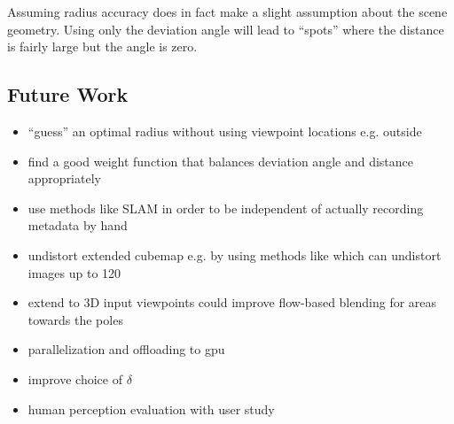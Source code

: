 Assuming radius accuracy does in fact make a slight assumption about the scene geometry. Using only the deviation angle will lead to ``spots'' where the distance is fairly large but the angle is zero. 

\subsection{Future Work}
\begin{itemize}
  \item ``guess'' an optimal radius without using viewpoint locations e.g. outside
  \item find a good weight function that balances deviation angle and distance appropriately
  \item use methods like SLAM in order to be independent of actually recording metadata by hand
  \item undistort extended cubemap e.g. by using methods like \cite{fov} which can undistort images up to 120\degree
  \item extend to 3D \ar input viewpoints could improve flow-based blending for areas towards the poles
  \item parallelization and offloading to gpu
  \item improve choice of $\delta$
  \item human perception evaluation with user study
\end{itemize}

